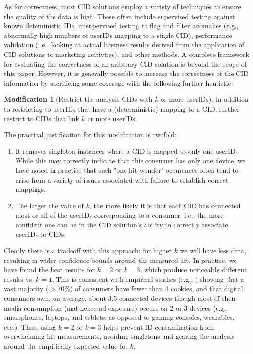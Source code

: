\documentclass[11pt,a4paper]{article}
\theoremstyle{definition}
\theoremstyle{remark}
\theoremstyle{definition}
\theoremstyle{definition}
\theoremstyle{definition}
\theoremstyle{definition}
\theoremstyle{definition}
\newtheorem{modification}{Modification}[section]
\theoremstyle{definition}
\begin{document}
As for correctness, most CID solutions employ a variety of techniques to ensure the quality of the data is high. These often include supervised testing against known deteministic IDs, unsupervised testing to flag and filter anomalies (e.g., abnormally high numbers of userIDs mapping to a single CID), performance validation (i.e., looking at actual business results derived from the application of CID solutions to marketing acitivties), and other methods. A complete framework for evaluating the correctness of an aribtrary CID solution is beyond the scope of this paper. However, it is generally possible to increase the correctness of the CID information by sacrificing some coverage with the following further heuristic: 

\begin{modification}[Restrict the analysis CIDs with $k$ or more userIDs]
In addition to restricting to userIDs that have a (deterministic) mapping to a CID, further restrict to CIDs that link $k$ or more userIDs. 
\end{modification}

The practical justification for this modification is twofold: 
\begin{enumerate}
\item It removes singleton instances where a CID is mapped to only one userID. While this may correctly indicate that this consumer has only one device, we have noted in practice that such "one-hit wonder" occurences often tend to arise from a variety of issues associated with failure to establish correct mappings. 
\item The larger the value of $k$, the more likely it is that each CID has connected most or all of the userIDs corresponding to a consumer, i.e., the more confident one can be in the CID solution's ability to correctly associate userIDs to CIDs.
\end{enumerate}

Clearly there is a tradeoff with this approach: for higher $k$ we will have less data, resulting in wider confidence bounds around the measured lift. In practice, we have found the best results for $k=2$ or $k=3$, which produce noticeably different results vs. $k=1$. This is consistent with empirical studies (e.g., \cite{coey2016people}) showing that a vast majority ($> 70\%$) of consumers have fewer than 4 cookies, and that digital consumers own, on average, about 3.5 connected devices \cite{emarketer-2016}
though most of their media consumption (and hence ad exposure) occurs on 2 or 3 devices (e.g., smartphones, laptops, and tablets, as opposed to gaming consoles, wearables, etc.). Thus, using $k=2$ or $k=3$ helps prevent ID contamination from overwhelming lift measurements, avoiding singletons and gearing the analysis around the empirically expected value for $k$.
\end{document}
